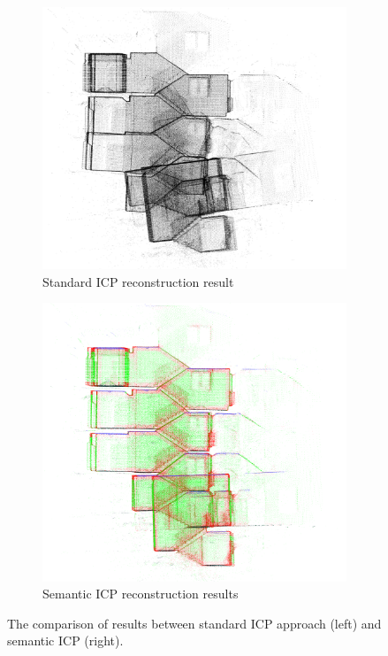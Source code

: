\documentclass{article}
\begin{document}
\begin{figure} [h]
	\centering
	\begin{subfigure} [b]{0.49\textwidth}
        \centering
        \includegraphics[width=\textwidth]{ROB-15-0035_fig29a.png}
        \caption{Standard ICP reconstruction result}
   \end{subfigure}
   \begin{subfigure} [b]{0.49\textwidth}
        \centering
        \includegraphics[width=\textwidth]{ROB-15-0035_fig29b.png}
        \caption{Semantic ICP reconstruction results}
   \end{subfigure}
   \caption{The comparison of results between standard ICP approach (left) and semantic ICP (right).}
   \label{fig:comparisonArea1}
\end{figure}
\end{document}
